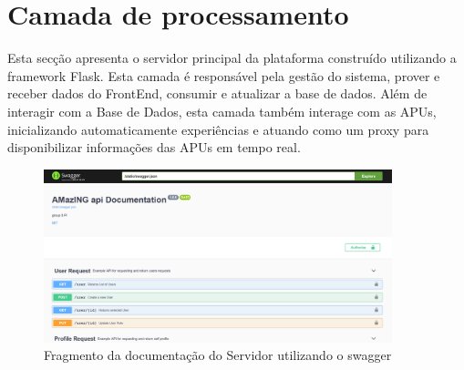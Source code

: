 \section{Camada de processamento}
Esta secção apresenta o servidor principal da plataforma construído utilizando a framework Flask. Esta camada é responsável pela gestão do sistema, prover e receber dados do FrontEnd, consumir e atualizar a base de dados. Além de interagir com a Base de Dados, esta camada também interage com as APUs, inicializando automaticamente experiências e atuando como um proxy para disponibilizar informações das APUs em tempo real.
\begin{figure}[!ht]
    \centering
    \includegraphics[width=0.9\textwidth]{images/swagger.png}
    \caption{Fragmento da documentação do Servidor utilizando o swagger}
    \label{fig:swagger}
\end{figure}

